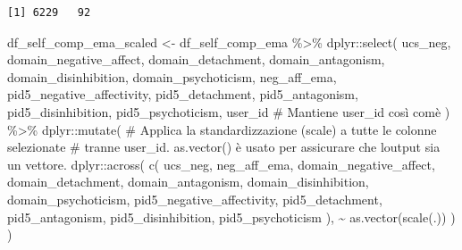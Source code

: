 \documentclass[
  11pt,
  a4paper,
  onecolumn]{article}
\newenvironment{Shaded}{}{}
\newcommand{\CommentTok}[1]{\textcolor[rgb]{0.42,0.45,0.49}{#1}}
\newcommand{\FunctionTok}[1]{\textcolor[rgb]{0.44,0.26,0.76}{#1}}
\newcommand{\NormalTok}[1]{\textcolor[rgb]{0.14,0.16,0.18}{#1}}
\newcommand{\OtherTok}[1]{\textcolor[rgb]{0.44,0.26,0.76}{#1}}
\newcommand{\SpecialCharTok}[1]{\textcolor[rgb]{0.00,0.36,0.77}{#1}}
\begin{document}
\begin{verbatim}
[1] 6229   92
\end{verbatim}

\begin{Shaded}
\begin{Highlighting}[]
\NormalTok{df\_self\_comp\_ema\_scaled }\OtherTok{\textless{}{-}}\NormalTok{ df\_self\_comp\_ema }\SpecialCharTok{\%\textgreater{}\%}
\NormalTok{  dplyr}\SpecialCharTok{::}\FunctionTok{select}\NormalTok{(}
\NormalTok{    ucs\_neg,}
\NormalTok{    domain\_negative\_affect,   }
\NormalTok{    domain\_detachment,}
\NormalTok{    domain\_antagonism,}
\NormalTok{    domain\_disinhibition,}
\NormalTok{    domain\_psychoticism,}
\NormalTok{    neg\_aff\_ema,}
\NormalTok{    pid5\_negative\_affectivity,}
\NormalTok{    pid5\_detachment,}
\NormalTok{    pid5\_antagonism,}
\NormalTok{    pid5\_disinhibition,}
\NormalTok{    pid5\_psychoticism,}
\NormalTok{    user\_id }\CommentTok{\# Mantiene user\_id così com\textquotesingle{}è}
\NormalTok{  ) }\SpecialCharTok{\%\textgreater{}\%}
\NormalTok{  dplyr}\SpecialCharTok{::}\FunctionTok{mutate}\NormalTok{(}
    \CommentTok{\# Applica la standardizzazione (scale) a tutte le colonne selezionate}
    \CommentTok{\# tranne user\_id. as.vector() è usato per assicurare che l\textquotesingle{}output sia un vettore.}
\NormalTok{    dplyr}\SpecialCharTok{::}\FunctionTok{across}\NormalTok{(}
      \FunctionTok{c}\NormalTok{(}
\NormalTok{        ucs\_neg,}
\NormalTok{        neg\_aff\_ema,}
\NormalTok{        domain\_negative\_affect,   }
\NormalTok{        domain\_detachment,}
\NormalTok{        domain\_antagonism,}
\NormalTok{        domain\_disinhibition,}
\NormalTok{        domain\_psychoticism,}
\NormalTok{        pid5\_negative\_affectivity,}
\NormalTok{        pid5\_detachment,}
\NormalTok{        pid5\_antagonism,}
\NormalTok{        pid5\_disinhibition,}
\NormalTok{        pid5\_psychoticism}
\NormalTok{      ),}
      \SpecialCharTok{\textasciitilde{}} \FunctionTok{as.vector}\NormalTok{(}\FunctionTok{scale}\NormalTok{(.))}
\NormalTok{    )}
\NormalTok{  )}
\end{Highlighting}
\end{Shaded}
\end{document}
